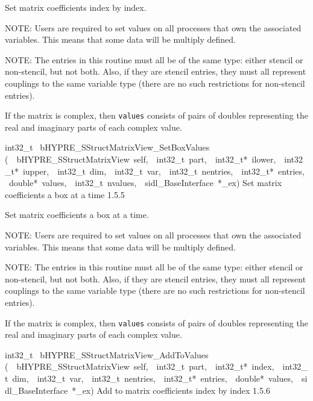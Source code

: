 \documentclass{article}
\begin{document}
\begin{cxxentry}
\begin{cxxentry}
\begin{cxxfunction}
\begin{cxxdoc}
Set matrix coefficients index by index.

NOTE: Users are required to set values on all processes that
own the associated variables.  This means that some data will
be multiply defined.

NOTE: The entries in this routine must all be of the same
type: either stencil or non-stencil, but not both.  Also, if
they are stencil entries, they must all represent couplings
to the same variable type (there are no such restrictions for
non-stencil entries).

If the matrix is complex, then {\tt values} consists of pairs
of doubles representing the real and imaginary parts of each
complex value.
\end{cxxdoc}
\end{cxxfunction}
\begin{cxxfunction}
{int32\_t\ }
        {bHYPRE\_SStructMatrixView\_SetBoxValues}
        {(\ \ bHYPRE\_SStructMatrixView\ self,\ \ int32\_t\ part,\ \ int32\_t*\ ilower,\ \ int32\_t*\ iupper,\ \ int32\_t\ dim,\ \ int32\_t\ var,\ \ int32\_t\ nentries,\ \ int32\_t*\ entries,\ \ double*\ values,\ \ int32\_t\ nvalues,\ \ sidl\_BaseInterface\ *\_ex)}
        {
Set matrix coefficients a box at a time}
        {1.5.5}
\begin{cxxdoc}

Set matrix coefficients a box at a time.

NOTE: Users are required to set values on all processes that
own the associated variables.  This means that some data will
be multiply defined.

NOTE: The entries in this routine must all be of the same
type: either stencil or non-stencil, but not both.  Also, if
they are stencil entries, they must all represent couplings
to the same variable type (there are no such restrictions for
non-stencil entries).

If the matrix is complex, then {\tt values} consists of pairs
of doubles representing the real and imaginary parts of each
complex value.
\end{cxxdoc}
\end{cxxfunction}
\begin{cxxfunction}
{int32\_t\ }
        {bHYPRE\_SStructMatrixView\_AddToValues}
        {(\ \ bHYPRE\_SStructMatrixView\ self,\ \ int32\_t\ part,\ \ int32\_t*\ index,\ \ int32\_t\ dim,\ \ int32\_t\ var,\ \ int32\_t\ nentries,\ \ int32\_t*\ entries,\ \ double*\ values,\ \ sidl\_BaseInterface\ *\_ex)}
        {
Add to matrix coefficients index by index}
        {1.5.6}
\begin{cxxdoc}


\end{cxxdoc}
\end{cxxfunction}
\end{cxxentry}
\end{cxxentry}
\end{document}
